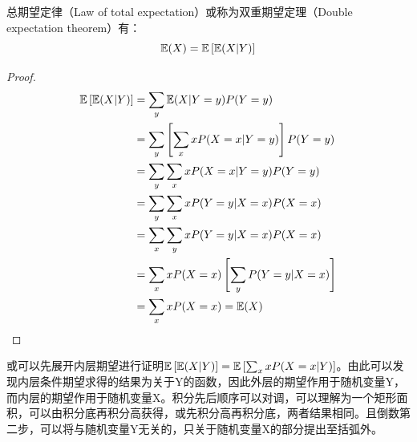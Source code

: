 \documentclass[11pt]{article}
\begin{document}
\begin{proposition}
    总期望定律（Law of total expectation）或称为双重期望定理（Double expectation theorem）有：
    \begin{equation*}
        \mathbb{E}(X) = \mathbb{E}\left[ \mathbb{E}(X|Y) \right]
    \end{equation*}
    
    \begin{proof}
        \begin{align*}
            \mathbb{E}\left[ \mathbb{E}(X|Y) \right]
            &= \sum_y \mathbb{E}(X|Y=y) P(Y=y)\\
            &= \sum_y \left[ \sum_x x P(X=x|Y=y) \right] P(Y=y) \\
            &= \sum_y \sum_x x P(X=x|Y=y) P(Y=y) \\
            &= \sum_y \sum_x x P(Y=y|X=x) P(X=x) \\
            &= \sum_x \sum_y x P(Y=y|X=x) P(X=x) \\
            &= \sum_x x P(X=x) \left[ \sum_y P(Y=y|X=x)\right] \\
            &= \sum_x x P(X=x) = \mathbb{E}(X)
        \end{align*}
    \end{proof}
\end{proposition}

\begin{remark}
    或可以先展开内层期望进行证明$\mathbb{E}\left[ \mathbb{E}(X|Y) \right] = \mathbb{E}\left[ \sum_x x P(X=x|Y) \right]$。由此可以发现内层条件期望求得的结果为关于Y的函数，因此外层的期望作用于随机变量Y，而内层的期望作用于随机变量X。积分先后顺序可以对调，可以理解为一个矩形面积，可以由积分底再积分高获得，或先积分高再积分底，两者结果相同。且倒数第二步，可以将与随机变量Y无关的，只关于随机变量X的部分提出至括弧外。
\end{remark}
\end{document}
